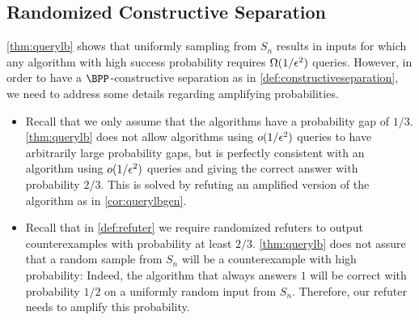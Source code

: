 \subsection{Randomized Constructive Separation}

\cref{thm:querylb} shows that uniformly sampling from $S_n$ results in inputs for which 
any algorithm with high success probability requires $\Omega(1/\epsilon^2)$ queries. 
However, in order to have a $\BPP$-constructive separation as in \cref{def:constructiveseparation},
we need to address some details regarding amplifying probabilities. 

\begin{itemize}
    \item Recall that we only assume that the algorithms have a probability gap of $1/3$. 
    \cref{thm:querylb} does not allow algorithms using $o(1/\epsilon^2)$ queries
    to have arbitrarily large probability gaps, but is perfectly consistent with an algorithm
    using $o(1/\epsilon^2)$ queries and giving the correct answer with 
    probability $2/3$. This is solved by refuting an amplified version of the algorithm as 
    in \cref{cor:querylbgen}.
    \item Recall that in \cref{def:refuter} we require randomized refuters to output
    counterexamples with probability at least $2/3$. \cref{thm:querylb} does not assure
    that a random sample from $S_n$ will be a counterexample with high probability: 
    Indeed, the algorithm that always answers $1$ will be correct with probability $1/2$ 
    on a uniformly random input from $S_n$. Therefore, our refuter needs to amplify this probability.
\end{itemize}

